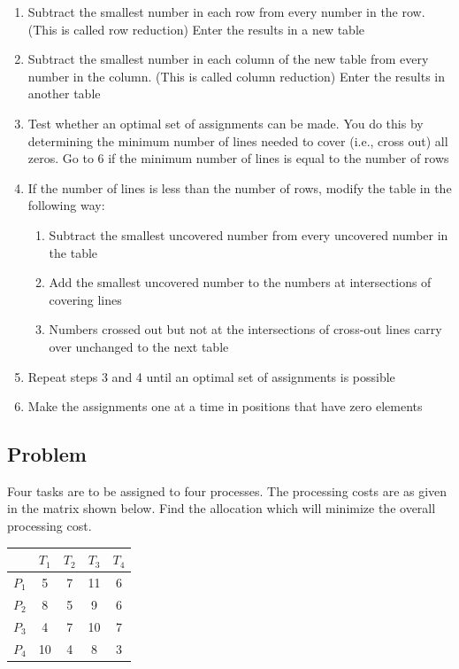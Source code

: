 \documentclass[12pt]{article}
\begin{document}
\begin{enumerate}
\item Subtract the smallest number in each row from every number in the row. (This is called row reduction) Enter the results in a new table
\item Subtract the smallest number in each column of the new table from every number in the column. (This is called column reduction) Enter the results in another table
\item Test whether an optimal set of assignments can be made. You do this by determining the minimum number of lines needed to cover (i.e., cross out) all zeros. Go to 6 if the minimum number of lines is equal to the number of rows
\item If the number of lines is less than the number of rows, modify the table in the following way:
\begin{enumerate}
\item Subtract the smallest uncovered number from every uncovered number in the table
\item Add the smallest uncovered number to the numbers at intersections of covering lines
\item Numbers crossed out but not at the intersections of cross-out lines carry over unchanged to the next table
\end{enumerate}
\item Repeat steps 3 and 4 until an optimal set of assignments is possible
\item Make the assignments one at a time in positions that have zero elements
\end{enumerate}

\subsection{Problem}
Four tasks are to be assigned to four processes. The processing costs are as given
in the matrix shown below. Find the allocation which will minimize the overall processing cost.


\begin{center}
\begin{tabular}{|c|cccc|}
\hline
   & $T_1$ & $T_2$ & $T_3$ & $T_4$ \\
\hline
$P_1$ & 5  & 7  & 11 & 6  \\
$P_2$ & 8  & 5  & 9  & 6  \\
$P_3$ & 4  & 7  & 10 & 7  \\
$P_4$ & 10 & 4  & 8  & 3  \\
\hline
\end{tabular}
\end{center}
\end{document}
